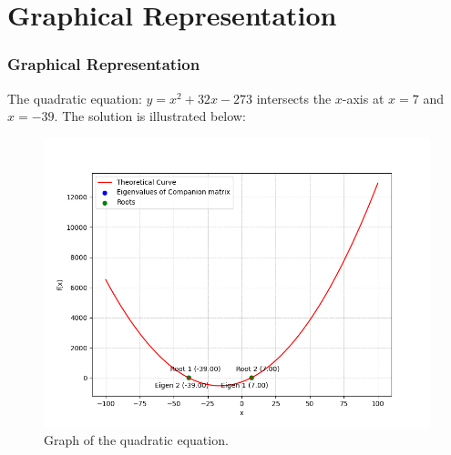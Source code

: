 \documentclass{beamer}
\numberwithin{equation}{section}
\begin{document}
\section{Graphical Representation}
\begin{frame}
\frametitle{Graphical Representation}
The quadratic equation: $y = x^2 + 32x - 273$ intersects the $x$-axis at $x = 7$ and $x = -39$. The solution is illustrated below:
\begin{figure}[h]
    \centering
    \includegraphics[width=0.8\linewidth]{figs/fig.png}
    \caption{Graph of the quadratic equation.}
\end{figure}
\end{frame}
\end{document}

